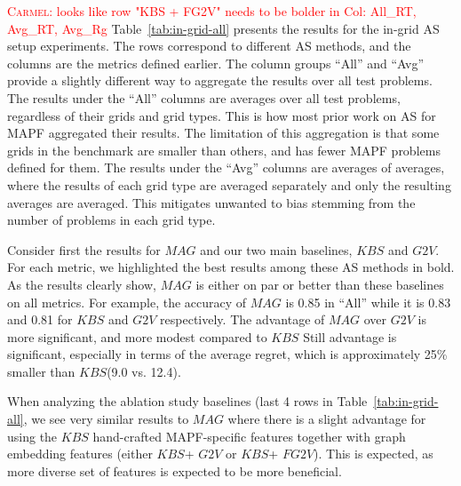 \documentclass{ecai}
\newcommand{\Carmel}[1]{\textcolor{red}{\textsc{Carmel}: #1}}
\newcommand{\Roni}[1]{}
\newcommand{\gtv}[1]{\ensuremath{\textit{G2V}}\xspace}
\newcommand{\fgtv}[1]{\ensuremath{\textit{FG2V}}\xspace}
\newcommand{\kaduri}[1]{\ensuremath{\textit{KBS}}\xspace}
\newcommand{\mapfgas}[1]{\ensuremath{\textit{MAG}}\xspace}
\begin{document}
\Carmel{ looks like row "KBS + FG2V" needs to be bolder in Col: All\_RT, Avg\_RT, Avg\_Rg }Table~\ref{tab:in-grid-all} presents the results for the in-grid AS setup experiments. The rows correspond to different AS methods, and the columns are the metrics defined earlier. 
The column groups ``All'' and ``Avg'' provide a slightly different way to aggregate the results over all test problems. 
The results under the ``All'' columns are averages over all test problems, regardless of their grids and grid types. 
This is how most prior work on AS for MAPF aggregated their results. 
The limitation of this aggregation is that some grids in the benchmark are smaller than others, and has fewer MAPF problems defined for them. 
The results under the ``Avg'' columns are averages of averages, where the results of each grid type are averaged separately and only the resulting averages are averaged. This mitigates unwanted to bias stemming from the number of problems in each grid type. 


Consider first the results for \mapfgas\ and our two main baselines, \kaduri\ and \gtv\ .
For each metric, we highlighted the best results among these AS methods in bold. 
As the results clearly show, \mapfgas\ is either on par or better than these baselines on all metrics. 
For example, the accuracy of \mapfgas\ is 0.85 in ``All'' while it is 0.83 and 0.81 for \kaduri\ and \gtv , respectively. 
The advantage of \mapfgas\ over \gtv\ is more significant, and more modest compared to \kaduri. 
Still advantage is significant, especially in terms of the average regret, which is approximately 25\% smaller than \kaduri\ (9.0 vs. 12.4). 


When analyzing the ablation study baselines (last 4 rows in Table~\ref{tab:in-grid-all}, we see very similar results to \mapfgas, where there is a slight advantage for using the \kaduri\ hand-crafted MAPF-specific features together with graph embedding features (either \kaduri\ + \gtv\ or \kaduri\ + \fgtv\ ). 
This is expected, as more diverse set of features is expected to be more beneficial. 
\end{document}
